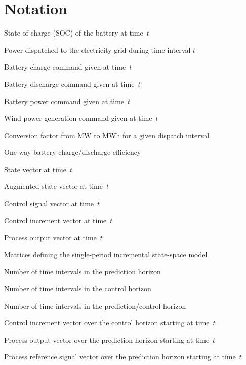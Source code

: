 \section{Notation}\label{sect:notation}
\begin{description}[before={\renewcommand\makelabel[1]{\normalfont ##1}}, itemsep=5pt, leftmargin=0.0cm, labelwidth=2.0cm]
	\item[$e(t)$]  State of charge (SOC) of the battery at time~$t$
	\item[$p_{d}(t)$]  Power dispatched to the electricity grid during time interval $t$
	\item[$p_{b+}(t)$]  Battery charge command given at time~$t$
	\item[$p_{b-}(t)$]  Battery discharge command given at time~$t$
	\item[$p_{b}(t)$]  Battery power command given at time~$t$
	\item[$p_{w}(t)$]  Wind power generation command given at time~$t$
	\item[$\mwmwh$]  Conversion factor from MW to MWh for a given dispatch interval
	\item[$\eff$]  One-way battery charge/discharge efficiency
	\item[$\boldsymbol{x}(t)$]  State vector at time~$t$
	\item[$\boldsymbol{z}(t)$]  Augmented state vector at time~$t$
	\item[$\boldsymbol{u}(t)$]  Control signal vector at time~$t$
	\item[$\boldsymbol{\Delta{u}}(t)$]  Control increment vector at time~$t$
	\item[$\boldsymbol{y}(t)$]  Process output vector at time~$t$
	\item[$A, B, C$]  Matrices defining the single-period incremental state-space model
	\item[$n_{y}$]  Number of time intervals in the prediction horizon
	\item[$n_{u}$]  Number of time intervals in the control horizon
	\item[$n$]  Number of time intervals in the prediction/control horizon
	\item[$\vv{\boldsymbol{\Delta{u}}}_{t}$]  Control increment vector over the control horizon starting at time~$t$
	\item[$\vv{\boldsymbol{y}}_{t}$]  Process output vector over the prediction horizon starting at time~$t$
	\item[$\vv{\boldsymbol{r}}_{t}$]  Process reference signal vector over the prediction horizon starting at time~$t$

\end{description}
